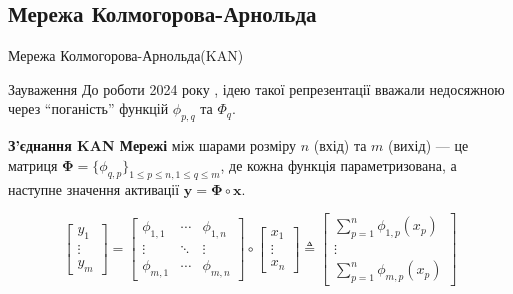 \documentclass{zkdl-presentation-template}
\begin{document}
    \subsection{Мережа Колмогорова-Арнольда}
    \begin{frame}{Мережа Колмогорова-Арнольда(KAN)}
        \begin{block}{Зауваження}
            До роботи 2024 року \cite{kan}, ідею такої репрезентації вважали недосяжною через
            ``поганість'' функцій $\phi_{p,q}$ та $\Phi_q$. 
        \end{block}

        \begin{definition}
            \textbf{З'єднання KAN Мережі} між шарами розміру $n$ (вхід)
            та $m$ (вихід) --- це матриця $\boldsymbol{\Phi} = \{\phi_{q,p}\}_{1 \leq p \leq n, 1 \leq q \leq m}$, де 
            кожна функція параметризована, а наступне значення активації $\boldsymbol{y} = \boldsymbol{\Phi} \circ \boldsymbol{x}$.
        \end{definition}

        \begin{equation*}
            \begin{bmatrix}
                y_1 \\
                \vdots \\
                y_{m}
            \end{bmatrix} =
            \begin{bmatrix}
                \phi_{1,1} & \cdots & \phi_{1,n} \\
                \vdots & \ddots & \vdots \\
                \phi_{m,1} & \cdots & \phi_{m,n}
            \end{bmatrix}\circ \begin{bmatrix}
                x_1 \\
                \vdots \\
                x_n
            \end{bmatrix} \triangleq \begin{bmatrix}
                \sum_{p=1}^n \phi_{1,p}(x_p) \\
                \vdots \\
                \sum_{p=1}^n \phi_{m,p}(x_p)
            \end{bmatrix}
        \end{equation*}
    \end{frame}
\end{document}
